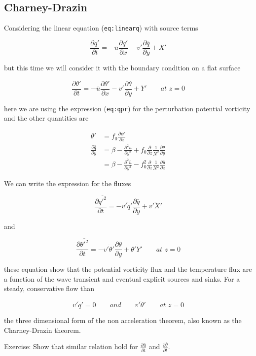 \subsection{Charney-Drazin}\label{charney-drazin}

Considering the linear equation (\texttt{eq:linearq}) with source terms

{\[\frac{\partial q'}{\partial t} = -\bar{u}\frac{\partial q'}{\partial x} - v'\frac{\partial \bar{q}}{\partial y} + X'\]}

but this time we will consider it with the boundary condition on a flat
surface

{\[\frac{\partial \theta'}{\partial t} = -\bar{u}\frac{\partial \theta'}{\partial x} - v'\frac{\partial \bar{\theta}}{\partial y}  + Y'    \qquad  at \,\, z = 0\]}

here we are using the expression (\texttt{eq:qpr}) for the perturbation
potential vorticity and the other quantities are

\[\begin{aligned}
\theta'&= f_0\frac{\partial \psi'}{\partial z}\\
\frac{\partial \bar{q}}{\partial y} &= \beta - \frac{\partial^{2} \bar{u}}{\partial y^{2}} + f_0\frac{\partial }{\partial z}\frac{1}{N^2}\frac{\partial \bar{\theta}}{\partial y}\\
&=\beta - \frac{\partial^{2} \bar{u}}{\partial y^{2}} - f_0^2\frac{\partial }{\partial z}\frac{1}{N^2}\frac{\partial \bar{u}}{\partial z}
\end{aligned}\]

We can write the expression for the fluxes

\[\frac{\partial \overline{q'^2}}{\partial t} = -\overline{v'q'}\frac{\partial \bar{q}}{\partial y} + \overline{v'X'}\]

and

\[\frac{\partial \overline{\theta'^2}}{\partial t} = -\overline{v'\theta'}\frac{\partial \bar{\theta}}{\partial y} + \overline{\theta'Y'}\qquad  at \,\, z = 0\]

these equation show that the potential vorticity flux and the
temperature flux are a function of the wave transient and eventual
explicit sources and sinks. For a steady, conservative flow than

\[\overline{v'q'}=0 \qquad and \qquad \overline{v'\theta'}\qquad  at \,\, z = 0\]

the three dimensional form of the non acceleration theorem, also known
as the Charney-Drazin theorem.

Exercise: Show that similar relation hold for
\(\frac{\partial \bar{u}}{\partial t}\) and
\(\frac{\partial \bar{\theta}}{\partial t}\).
